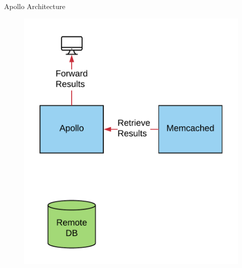 \documentclass[10pt]{beamer}
\begin{document}
\begin{frame}[fragile]{Apollo Architecture}
    \begin{figure}
        \includegraphics[scale=0.17]{apollo_arch_diagram_3}
    \end{figure}
\end{frame}
\end{document}
